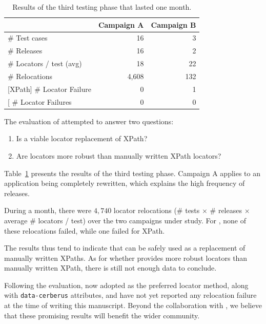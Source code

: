 \begin{table}[]
\centering
\begin{tabular}{l|r|r|}
\cline{2-3}
                                                       & \bf Campaign A & \bf Campaign B \\ \hline
\multicolumn{1}{|l|}{\# Test cases}                        & 16         & 3          \\ \hline
\multicolumn{1}{|l|}{\# Releases}                          & 16         & 2          \\ \hline
\multicolumn{1}{|l|}{\# Locators / test (avg)}             & 18         & 22          \\ \hline
\multicolumn{1}{|l|}{\# Relocations}                       & 4,608       & 132         \\ \hline
\multicolumn{1}{|l|}{{[}XPath{]} \# Locator Failure} & 0          & 1          \\ \hline
\multicolumn{1}{|l|}{{[}\erratum{}{]} \# Locator Failures} & 0          & 0          \\ \hline
\end{tabular}
\caption{Results of the third testing phase that lasted one month.}
\label{table:results}
\end{table}

The evaluation of \erratum attempted to answer two questions:
\begin{enumerate}
\item Is \erratum a viable locator replacement of XPath?
\item Are \erratum locators more robust than manually written XPath locators?
\end{enumerate}

Table~\ref{table:results} presents the results of the third testing phase.
Campaign A applies to an application being completely rewritten, which explains the high frequency of releases.

During a month, there were $4,740$ locator relocations (\# tests $\times$ \# releases $\times$ average \# locators / test) over the two campaigns under study.
For \erratum, none of these relocations failed, while one failed for XPath.

The results thus tend to indicate that \erratum can be safely used as a replacement of manually written {\sc XPaths}.
As for whether \erratum provides more robust locators than manually written XPath, there is still not enough data to conclude. 

Following the evaluation, \laredoute{} now adopted \erratum as the preferred locator method, along with \texttt{data-cerberus} attributes, and have not yet reported any relocation failure at the time of writing this manuscript.
Beyond the collaboration with \laredoute, we believe that these promising results will benefit the wider \cerberus community.

